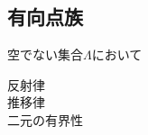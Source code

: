 \subsection{有向点族}
	\begin{screen}
		\begin{dfn}[有向集合]
			空でない集合$\Lambda$において
			\begin{description}
				\item[反射律] 
				\item[推移律]
				\item[二元の有界性]
			\end{description}
		\end{dfn}
	\end{screen}